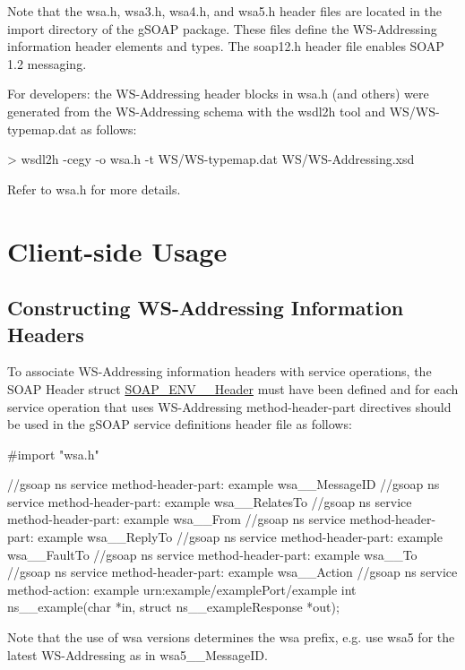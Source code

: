 Note that the wsa.h, wsa3.h, wsa4.h, and wsa5.h header files are located in the import directory of the gSOAP package. These files define the WS-\/Addressing information header elements and types. The soap12.h header file enables SOAP 1.2 messaging.

For developers: the WS-\/Addressing header blocks in wsa.h (and others) were generated from the WS-\/Addressing schema with the wsdl2h tool and WS/WS-\/typemap.dat as follows:


\begin{DoxyCode}
    > wsdl2h -cegy -o wsa.h -t WS/WS-typemap.dat WS/WS-Addressing.xsd
\end{DoxyCode}


Refer to wsa.h for more details.\hypertarget{wsa__0_wsa_2}{}\section{Client-\/side Usage}\label{wsa__0_wsa_2}
\hypertarget{wsa__0_wsa_2_1}{}\subsection{Constructing WS-\/Addressing Information Headers}\label{wsa__0_wsa_2_1}
To associate WS-\/Addressing information headers with service operations, the SOAP Header struct \hyperlink{structSOAP__ENV____Header}{SOAP\_\-ENV\_\-\_\-Header} must have been defined and for each service operation that uses WS-\/Addressing method-\/header-\/part directives should be used in the gSOAP service definitions header file as follows:


\begin{DoxyCode}
#import "wsa.h"

//gsoap ns service method-header-part: example wsa__MessageID
//gsoap ns service method-header-part: example wsa__RelatesTo
//gsoap ns service method-header-part: example wsa__From
//gsoap ns service method-header-part: example wsa__ReplyTo
//gsoap ns service method-header-part: example wsa__FaultTo
//gsoap ns service method-header-part: example wsa__To
//gsoap ns service method-header-part: example wsa__Action
//gsoap ns service method-action: example urn:example/examplePort/example
int ns__example(char *in, struct ns__exampleResponse *out);
\end{DoxyCode}


Note that the use of wsa versions determines the wsa prefix, e.g. use wsa5 for the latest WS-\/Addressing as in wsa5\_\-\_\-MessageID.

